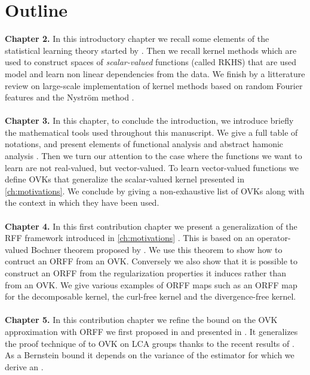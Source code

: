 \section{Outline}
\textbf{Chapter 2.}
In this introductory chapter we recall some elements of the statistical
learning theory started by \citet{Vapnik1998}. Then we recall kernel methods
\citep{Aronszajn1950} which are used to construct spaces of
\emph{scalar-valued} functions (called \acs{RKHS}) that are used model and
learn non linear dependencies from the data. We finish by a litterature review
on large-scale implementation of kernel methods based on random Fourier
features \citep{Rahimi2007} and the Nystr\"om method
\citep{Williams2000-nystrom}.
\paragraph{}
\textbf{Chapter 3.}
In this chapter, to conclude the introduction, we introduce briefly the
mathematical tools used throughout this manuscript. We give a full table of
notations, and present elements of functional analysis
\citep{kurdila2006convex} and abstract hamonic analysis
\citep{folland1994course}. Then we turn our attention to the case where the
functions we want to learn are not real-valued, but vector-valued.  To learn
vector-valued functions we define \aclp{OVK} \citep{Micchelli2005, Carmeli2010}
that generalize the scalar-valued kernel presented in \cref{ch:motivations}. We
conclude by giving a non-exhaustive list of \aclp{OVK} along with the context
in which they have been used.

\paragraph{}
\textbf{Chapter 4.}
In this first contribution chapter we present a generalization of the \acs{RFF}
framework introduced in \cref{ch:motivations} \citep{brault2016random}. This is
based on an operator-valued Bochner theorem proposed by \citet{Carmeli2010}. We
use this theorem to show how to contruct an \acf{ORFF} from an \acs{OVK}.
Conversely we also show that it is possible to construct an \acs{ORFF} from the
regularization properties it induces rather than from an \acs{OVK}. We give
various examples of \acs{ORFF} maps such as an \acs{ORFF} map for the
decomposable kernel, the curl-free kernel and the divergence-free kernel.

\paragraph{}
\textbf{Chapter 5.} 
In this contribution chapter we refine the bound on the \ac{OVK} approximation
with \ac{ORFF} we first proposed in \cite{brault2016random} and presented in
\cite{braultborne}. It generalizes the proof technique of \citet{Rahimi2007} to
\ac{OVK} on \ac{LCA} groups thanks to the recent results of
\citet{sutherland2015, tropp2015introduction, minsker2011some,
koltchinskii2013remark}. As a Bernstein bound it depends on the variance of the
estimator for which we derive an .

